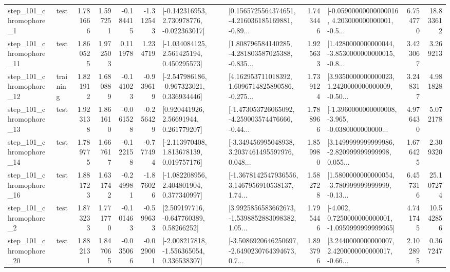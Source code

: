 \begin{tabular}{llrrrrllrlrr}
   step\_101\_chromophore\_1 &      test &      1.781666 &    1.597251 &     -0.184415 & -1.312543 &   [-0.142316953, 2.730978776, -0.022363017] &  [0.1565725564374651, -4.216036185169881, -0.89... &       1.743446 &  [-0.05900000000000016, 4.203000000000001, -0.5... &            6.754770 &         18.833612 \\
  step\_101\_chromophore\_11 &      test &      1.860525 &    1.972503 &      0.111978 &  1.234719 &    [-1.034084125, 2.561425194, 0.450295573] &  [1.808796584140285, -4.281803587025388, -0.835... &       1.925633 &  [1.4280000000000044, -3.8530000000000015, -0.8... &            3.423067 &          3.269213 \\
  step\_101\_chromophore\_12 &  training &      1.821912 &    1.680889 &     -0.141023 & -0.939619 &   [-2.547986186, -0.967323021, 0.336934446] &  [4.162953711018392, 1.6096714825890586, -0.275... &       1.739124 &  [3.9350000000000023, 1.2420000000000009, -0.50... &            3.248317 &          4.981828 \\
  step\_101\_chromophore\_13 &      test &      1.923138 &    1.861610 &     -0.061528 & -0.256429 &      [0.920441926, 2.56691944, 0.261779207] &  [-1.473053726065092, -4.259003574476666, -0.44... &       1.788966 &  [-1.3960000000000008, -3.965, -0.0380000000000... &            4.976430 &          5.072178 \\
  step\_101\_chromophore\_14 &      test &      1.789775 &    1.667617 &     -0.122158 & -0.777494 &    [-2.113970408, 1.813678139, 0.019757176] &  [-3.349456995048938, 3.2037461495597976, 0.048... &       1.859980 &  [3.1499999999999986, -2.820999999999998, 0.055... &            1.676425 &          2.309320 \\
  step\_101\_chromophore\_16 &      test &      1.881723 &    1.631742 &     -0.249981 & -1.876026 &    [-1.082208956, 2.404801904, 0.377340997] &  [-1.3678142547936556, 3.1467956910538137, 1.74... &       1.582728 &  [1.5800000000000054, -3.780999999999999, -0.13... &            6.457316 &         25.107274 \\
   step\_101\_chromophore\_2 &      test &      1.873233 &    1.771770 &     -0.101463 & -0.599633 &     [2.509197716, -0.647760389, 0.58266252] &  [3.9925856583662673, -1.5398852883098382, 1.05... &       1.795446 &  [-4.002, 0.7250000000000001, -1.0959999999999965] &            4.741745 &         10.542856 \\
  step\_101\_chromophore\_20 &      test &      1.882131 &    1.847065 &     -0.035066 & -0.029001 &   [-2.008217818, -1.556365054, 0.336538307] &  [-3.5086920646250697, -2.6490230764394673, 0.7... &       1.893796 &  [3.2440000000000007, 2.4200000000000017, -0.66... &            2.102895 &          0.367247 \\

\end{tabular}
